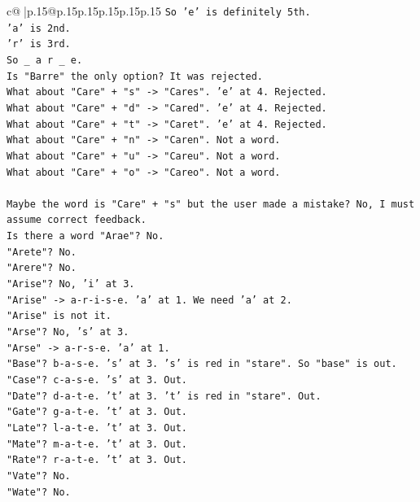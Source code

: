 \documentclass{article}
\begin{document}
{\begin{supertabular}{c@{$\;$}|p{.15\linewidth}@{}p{.15\linewidth}p{.15\linewidth}p{.15\linewidth}p{.15\linewidth}p{.15\linewidth}}
{{{\texttt{So 'e' is definitely 5th.} \\
\texttt{'a' is 2nd.} \\
\texttt{'r' is 3rd.} \\
\texttt{So \_ a r \_ e.} \\
\texttt{Is "Barre" the only option? It was rejected.} \\
\texttt{What about "Care" + "s" {-}> "Cares". 'e' at 4. Rejected.} \\
\texttt{What about "Care" + "d" {-}> "Cared". 'e' at 4. Rejected.} \\
\texttt{What about "Care" + "t" {-}> "Caret". 'e' at 4. Rejected.} \\
\texttt{What about "Care" + "n" {-}> "Caren". Not a word.} \\
\texttt{What about "Care" + "u" {-}> "Careu". Not a word.} \\
\texttt{What about "Care" + "o" {-}> "Careo". Not a word.} \\
\\ 
\texttt{Maybe the word is "Care" + "s" but the user made a mistake? No, I must assume correct feedback.} \\
\texttt{Is there a word "Arae"? No.} \\
\texttt{"Arete"? No.} \\
\texttt{"Arere"? No.} \\
\texttt{"Arise"? No, 'i' at 3.} \\
\texttt{"Arise" {-}> a{-}r{-}i{-}s{-}e. 'a' at 1. We need 'a' at 2.} \\
\texttt{"Arise" is not it.} \\
\texttt{"Arse"? No, 's' at 3.} \\
\texttt{"Arse" {-}> a{-}r{-}s{-}e. 'a' at 1.} \\
\texttt{"Base"? b{-}a{-}s{-}e. 's' at 3. 's' is red in "stare". So "base" is out.} \\
\texttt{"Case"? c{-}a{-}s{-}e. 's' at 3. Out.} \\
\texttt{"Date"? d{-}a{-}t{-}e. 't' at 3. 't' is red in "stare". Out.} \\
\texttt{"Gate"? g{-}a{-}t{-}e. 't' at 3. Out.} \\
\texttt{"Late"? l{-}a{-}t{-}e. 't' at 3. Out.} \\
\texttt{"Mate"? m{-}a{-}t{-}e. 't' at 3. Out.} \\
\texttt{"Rate"? r{-}a{-}t{-}e. 't' at 3. Out.} \\
\texttt{"Vate"? No.} \\
\texttt{"Wate"? No.} \\
}}}
\end{supertabular}}
\end{document}

